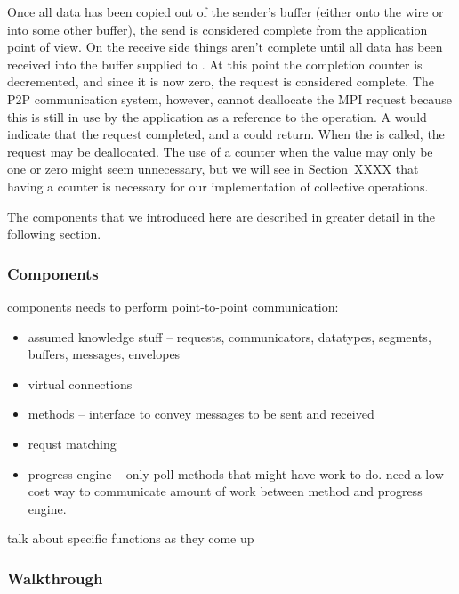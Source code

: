 Once all data has been copied out of the sender's buffer (either onto the wire
or into some other buffer), the send is considered complete from the
application point of view.  On the receive side things aren't complete until
all data has been received into the buffer supplied to .
%
At this point the completion counter is decremented, and since it is now zero,
the request is considered complete.  The P2P communication system, however,
cannot deallocate the MPI request because this is still in use by the
application as a reference to the operation.
%
A  would indicate that
the request completed, and a  could return.
%
When the  is called, the request may be deallocated.
%
The use of a counter when the value may only be one or zero might seem
unnecessary, but we will see in Section~XXXX that having a counter is
necessary for our implementation of collective operations.

\begin{comment}
  \emph{\mpifunc{MPI_TEST} and \mpifunc{MPI_WAIT} do the same thing on
    completion.  The above text needs a little cleanup to make that clear.}
\end{comment}

The components that we introduced here are described in greater detail in the
following section.

\subsubsection{Components}

components needs to perform point-to-point communication:
\begin{itemize}
\item assumed knowledge stuff -- requests, communicators, datatypes, segments, buffers, messages, envelopes
\item virtual connections
\item methods --
interface to convey messages to be sent and received
\item requst matching
\item progress engine --
only poll methods that might have work to do.  need a low cost way to
communicate amount of work between method and progress engine.
\end{itemize}

talk about specific functions as they come up

\subsubsection{Walkthrough}
\label{sssec:walkthrough}



